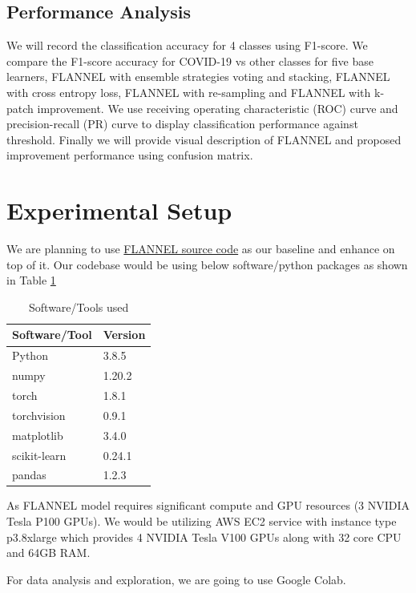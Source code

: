 \documentclass{sigkddExp}
\begin{document}
\subsection{Performance Analysis}
We will record the classification accuracy for 4 classes using F1-score. We
compare the F1-score accuracy for COVID-19 vs other classes for five base
learners, FLANNEL with ensemble strategies voting and stacking, FLANNEL with
cross entropy loss, FLANNEL with re-sampling and FLANNEL with k-patch
improvement. We use receiving operating characteristic (ROC) curve and
precision-recall (PR) curve to display classification performance against
threshold. Finally we will provide visual description of FLANNEL and proposed
improvement performance using confusion matrix.

\section{Experimental Setup}
We are planning to use \href{https://github.com/qxiaobu/FLANNEL} {FLANNEL source
    code}  as our baseline and enhance on top of it. Our codebase would be
using below software/python packages as shown in Table \ref{table:package}
\begin{table}[h]
    \centering
    \caption{Software/Tools used}
    \label{table:package}
    \begin{tabular}{|l|l|} \hline
        Software/Tool & Version \\ \hline
        Python        & 3.8.5   \\ \hline
        numpy         & 1.20.2  \\ \hline
        torch         & 1.8.1   \\ \hline
        torchvision   & 0.9.1   \\ \hline
        matplotlib    & 3.4.0   \\ \hline
        scikit-learn  & 0.24.1  \\ \hline
        pandas        & 1.2.3   \\
        \hline\end{tabular}
\end{table}

As FLANNEL model requires significant compute and GPU
resources (3 NVIDIA Tesla P100 GPUs). We would be utilizing AWS EC2 service with
instance type p3.8xlarge which provides 4 NVIDIA Tesla V100 GPUs along with 32
core CPU and 64GB RAM.

For data analysis and exploration, we are going to use Google Colab.
\end{document}
